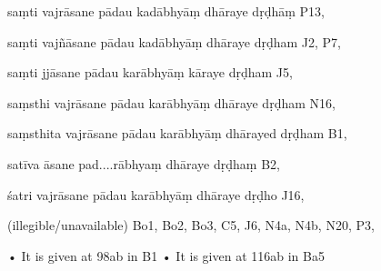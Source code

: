 \begin{marma}[hp03_064]
\item[saṃti vajrāsane pādau kadābhyāṃ dhāraye dṛḍhāṃ] P13,
\item[saṃti vajñāsane pādau kadābhyāṃ dhāraye dṛḍham] J2, P7, 
\item[saṃti jjāsane pādau karābhyāṃ kāraye dṛḍham] J5,
\item[saṃsthi vajrāsane pādau karābhyāṃ dhāraye dṛḍham] N16,
\item[saṃsthita vajrāsane pādau karābhyāṃ dhārayed dṛḍham] B1,
\item[satīva āsane pad....rābhyaṃ dhāraye dṛḍhaṃ] B2,
\item[śatri vajrāsane pādau karābhyāṃ dhāraye dṛḍho] J16,
\item[(illegible/unavailable)] Bo1, Bo2, Bo3, C5, J6, N4a, N4b, N20, P3,

  \begin{description}
    • It is given at 98ab in B1
    • It is given at 116ab in Ba5
  \end{description}

\end{marma}

